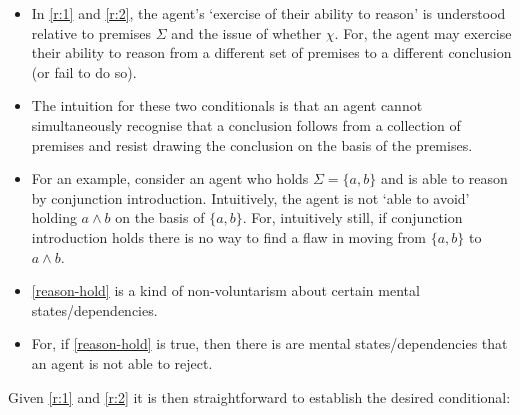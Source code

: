 \documentclass[10pt]{article}
\begin{document}
\begin{itemize}
\item In \ref{r:1} and \ref{r:2}, the agent's `exercise of their ability to reason' is understood relative to premises \(\Sigma\) and the issue of whether \(\chi\).
For, the agent may exercise their ability to reason from a different set of premises to a different conclusion (or fail to do so).
\item The intuition for these two conditionals is that an agent cannot simultaneously recognise that a conclusion follows from a collection of premises and resist drawing the conclusion on the basis of the premises.
\item For an example, consider an agent who holds \(\Sigma = \{a,b\}\) and is able to reason by conjunction introduction.
  Intuitively, the agent is not `able to avoid' holding \(a \land b\) on the basis of \(\{a,b\}\).
  For, intuitively still, if conjunction introduction holds there is no way to find a flaw in moving from \(\{a,b\}\) to \(a \land b\).
\end{itemize}

\begin{itemize}
\item \ref{reason-hold} is a kind of non-voluntarism about certain mental states/dependencies.
\item For, if \ref{reason-hold} is true, then there is are mental states/dependencies that an agent is not able to reject.
\end{itemize}


Given \ref{r:1} and \ref{r:2} it is then straightforward to establish the desired conditional:
\end{document}

